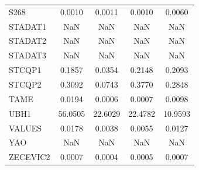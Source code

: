 \begin{longtable}{lcccc}
S268     &   0.0010 &   0.0011 &     0.0010 &   0.0060 \\
STADAT1  &      NaN &      NaN &        NaN &      NaN \\
STADAT2  &      NaN &      NaN &        NaN &      NaN \\
STADAT3  &      NaN &      NaN &        NaN &      NaN \\
STCQP1   &   0.1857 &   0.0354 &     0.2148 &   0.2093 \\
STCQP2   &   0.3092 &   0.0743 &     0.3770 &   0.2848 \\
TAME     &   0.0194 &   0.0006 &     0.0007 &   0.0098 \\
UBH1     &  56.0505 &  22.6029 &    22.4782 &  10.9593 \\
VALUES   &   0.0178 &   0.0038 &     0.0055 &   0.0127 \\
YAO      &      NaN &      NaN &        NaN &      NaN \\
ZECEVIC2 &   0.0007 &   0.0004 &     0.0005 &   0.0007 \\
\end{longtable}
